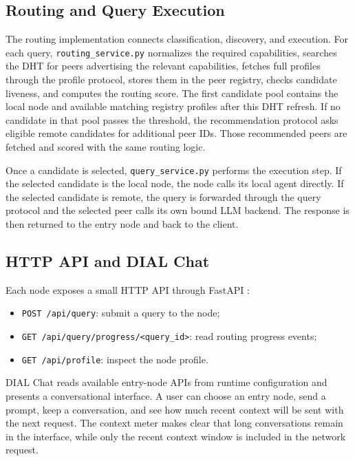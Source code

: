 \subsection{Routing and Query Execution}

The routing implementation connects classification, discovery, and execution.
For each query, \texttt{routing\_service.py} normalizes the required
capabilities, searches the DHT for peers advertising the relevant capabilities,
fetches full profiles through the profile protocol, stores them in the peer
registry, checks candidate liveness, and computes the routing score. The first
candidate pool contains the local node and available matching registry profiles
after this DHT refresh. If no candidate in that pool passes the threshold, the
recommendation protocol asks eligible remote candidates for additional peer IDs.
Those recommended peers are fetched and scored with the same routing logic.

Once a candidate is selected, \texttt{query\_service.py} performs the execution
step. If the selected candidate is the local node, the node calls its local
agent directly. If the selected candidate is remote, the query is forwarded
through the query protocol and the selected peer calls its own bound LLM
backend. The response is then returned to the entry node and back to the
client.

\subsection{HTTP API and DIAL Chat}

Each node exposes a small HTTP API through FastAPI \citep{fastapi}:

\begin{itemize}
  \item \texttt{POST /api/query}: submit a query to the node;
  \item \texttt{GET /api/query/progress/<query\_id>}: read routing progress
  events;
  \item \texttt{GET /api/profile}: inspect the node profile.
\end{itemize}

DIAL Chat reads available entry-node APIs from runtime configuration and
presents a conversational interface. A user can choose an entry node, send a
prompt, keep a conversation, and see how much recent context will be sent with
the next request. The context meter makes clear that long conversations remain
in the interface, while only the recent context window is included in the
network request.

